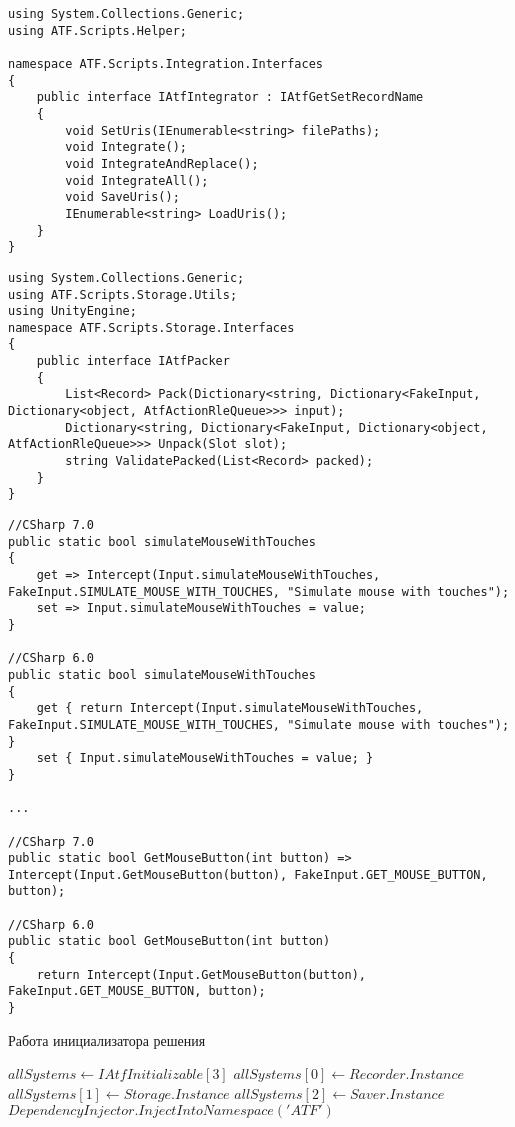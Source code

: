 \begin{lstlisting}[caption={Интерфейс модуля интеграции в готовую кодовую базу},label=iIntegrator]
using System.Collections.Generic;
using ATF.Scripts.Helper;

namespace ATF.Scripts.Integration.Interfaces
{
	public interface IAtfIntegrator : IAtfGetSetRecordName
	{
		void SetUris(IEnumerable<string> filePaths);
		void Integrate();
		void IntegrateAndReplace();
		void IntegrateAll();
		void SaveUris();
		IEnumerable<string> LoadUris();
	}
}
\end{lstlisting}

\begin{lstlisting}[caption={Интерфейс модуля упаковки хранилища данных},label=iPacker]
using System.Collections.Generic;
using ATF.Scripts.Storage.Utils;
using UnityEngine;
namespace ATF.Scripts.Storage.Interfaces
{
	public interface IAtfPacker
	{
		List<Record> Pack(Dictionary<string, Dictionary<FakeInput, Dictionary<object, AtfActionRleQueue>>> input);
		Dictionary<string, Dictionary<FakeInput, Dictionary<object, AtfActionRleQueue>>> Unpack(Slot slot);
		string ValidatePacked(List<Record> packed);
	}
}
\end{lstlisting}

\begin{lstlisting}[caption={Пример изменения тела метода и параметра класса Input в классе-арбитре AtfInput},label=atf_methods_refactor_example]
//CSharp 7.0
public static bool simulateMouseWithTouches
{
	get => Intercept(Input.simulateMouseWithTouches, 	FakeInput.SIMULATE_MOUSE_WITH_TOUCHES, "Simulate mouse with touches");
	set => Input.simulateMouseWithTouches = value;
}

//CSharp 6.0
public static bool simulateMouseWithTouches
{
	get { return Intercept(Input.simulateMouseWithTouches, 	FakeInput.SIMULATE_MOUSE_WITH_TOUCHES, "Simulate mouse with touches"); }
	set { Input.simulateMouseWithTouches = value; }
}

...

//CSharp 7.0
public static bool GetMouseButton(int button) => Intercept(Input.GetMouseButton(button), FakeInput.GET_MOUSE_BUTTON, button);

//CSharp 6.0
public static bool GetMouseButton(int button)
{
	return Intercept(Input.GetMouseButton(button), FakeInput.GET_MOUSE_BUTTON, button);
}
\end{lstlisting}


\begin{algorithm}
	\caption{Работа инициализатора решения}\label{alg:initializer}
	\begin{algorithmic}
		\State $allSystems \gets IAtfInitializable[3]$
		\State $allSystems[0] \gets Recorder.Instance$
		\State $allSystems[1] \gets Storage.Instance$
		\State $allSystems[2] \gets Saver.Instance$
		  \EndFor
		\State $DependencyInjector.InjectIntoNamespace('ATF')$
	\end{algorithmic}
\end{algorithm}

